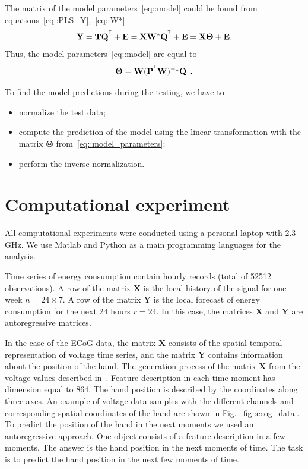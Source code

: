 \documentclass[runningheads]{llncs}
\newcommand{\bY}{\mathbf{Y}}
\newcommand{\bX}{\mathbf{X}}
\newcommand{\bP}{\mathbf{P}}
\newcommand{\bT}{\mathbf{T}}
\newcommand{\bQ}{\mathbf{Q}}
\newcommand{\bE}{\mathbf{E}}
\newcommand{\bW}{\mathbf{W}}
\newcommand{\bTheta}{\boldsymbol{\Theta}}
\newcommand{\T}{^{\text{\tiny\sffamily\upshape\mdseries T}}}
\begin{document}
The matrix of the model parameters~\ref{eq::model} could be found from equations~\eqref{eq::PLS_Y},~\eqref{eq::W*}
\begin{equation*}
    \bY = \bT \bQ^{\T} + \bE = \bX \bW^* \bQ^{\T} + \bE = \bX \bTheta + \bE.
\end{equation*}
Thus, the model parameters~\eqref{eq::model} are equal to
\begin{equation}
    \bTheta = \bW (\bP^{\T} \bW)^{-1} \bQ^{\T}.
    \label{eq::model_parameters}
\end{equation}

To find the model predictions during the testing, we have to
\begin{itemize}
	\item normalize the test data;
	\item compute the prediction of the model using the linear transformation with the matrix $\bTheta$ from~\eqref{eq::model_parameters};
	\item perform the inverse normalization.
\end{itemize}

\section{Computational experiment}
\label{sec:exper}
All computational experiments were conducted using a personal laptop with 2.3 GHz.
We use Matlab and Python as a main programming languages for the analysis.
 
Time series of energy consumption contain hourly records (total of 52512 observations). 
A row of the matrix $\bX$ is the local history of the signal for one week $n = 24 \times 7$. 
A row of the matrix $\bY$ is the local forecast of energy consumption for the next 24 hours $r = 24$. 
In this case, the matrices $\bX$ and $\bY$ are autoregressive matrices.

In the case of the ECoG data, the matrix $\bX$ consists of the spatial-temporal representation of voltage time series, and the matrix $\bY$ contains information about the position of the hand.
The generation process of the matrix $\bX$ from the voltage values described in~\cite{gasanov2017pls}. 
Feature description in each time moment has dimension equal to $864$. The hand position is described by the coordinates along three axes. 
An example of voltage data samples with the different channels and corresponding spatial coordinates of the hand are shown in Fig.~\ref{fig::ecog_data}.
To predict the position of the hand in the next moments we used an autoregressive approach.
One object consists of a feature description in a few moments. 
The answer is the hand position in the next moments of time.
The task is to predict the hand position in the next few moments of time.
\end{document}
